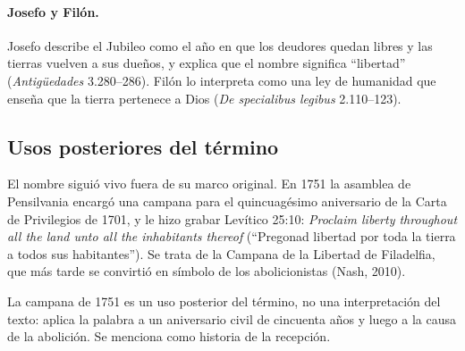 \documentclass[11pt,letterpaper]{article}
\begin{document}
\paragraph{Josefo y Filón.} Josefo describe el Jubileo como el año en que los deudores quedan libres y las tierras vuelven a sus dueños, y explica que el nombre significa ``libertad'' (\emph{Antigüedades} 3.280--286). Filón lo interpreta como una ley de humanidad que enseña que la tierra pertenece a Dios (\emph{De specialibus legibus} 2.110--123).

\subsection{Usos posteriores del término}
El nombre siguió vivo fuera de su marco original. En 1751 la asamblea de Pensilvania encargó una campana para el quincuagésimo aniversario de la Carta de Privilegios de 1701, y le hizo grabar Levítico 25:10: \emph{Proclaim liberty throughout all the land unto all the inhabitants thereof} (``Pregonad libertad por toda la tierra a todos sus habitantes''). Se trata de la Campana de la Libertad de Filadelfia, que más tarde se convirtió en símbolo de los abolicionistas (Nash, 2010).

\begin{nota}[Precisión]
La campana de 1751 es un uso posterior del término, no una interpretación del texto: aplica la palabra a un aniversario civil de cincuenta años y luego a la causa de la abolición. Se menciona como historia de la recepción.
\end{nota}
\end{document}
